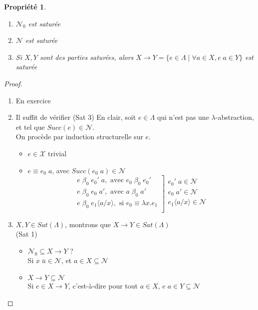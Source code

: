 \documentclass{article}
\newtheorem{prop}{Propriété}
\newcommand\subst[2]{\langle #1\big/#2\rangle}
\newcommand\lterm[2]{\lambda #1. #2}
\newcommand\tlambda[0]{$\lambda$}
\begin{document}
\begin{prop}
\begin{enumerate}[noitemsep,label=\roman*)]
\item $\mathcal{N}_0$ est saturée
\item $\mathcal{N}$ est saturée
\item Si $X, Y$ sont des parties saturées, alors $X \to Y = \{ e\in \Lambda \;|\; \forall a\in X, e\; a \in Y\}$ est saturée
\end{enumerate}
\end{prop}
\begin{proof}
\begin{enumerate}[noitemsep,label=\roman*)]
\item En exercice
\item Il suffit de vérifier (Sat 3)
En clair, soit $e\in \Lambda$ qui n'est pas une \tlambda-abstraction, et tel que $Succ(e)\in \mathcal{N}$.\\
On procède par induction structurelle sur $e$.
\begin{itemize}[label=*]
\item $e\in \mathcal{X}$ trivial
\item $e\equiv e_0\; a$, avec $Succ (e_0\; a)\in \mathcal{N}$
\[
\left.
\begin{array}{r}
e\;\beta_0\; e_0'\; a, \text{ avec } e_0\;\beta_0\; e_0'\\
e\;\beta_0\; e_0\; a', \text{ avec } a\;\beta_0\; a'\\
e\;\beta_0\; e_1\subst{a}{x}, \text{ si } e_0\equiv\lterm{x}{e_1}\\
\end{array}
\right]
\begin{array}{l}
e_0'\; a \in \mathcal{N}\\
e_0\; a'\in \mathcal{N}\\
e_1\subst{a}{x}\in \mathcal{N}\\
\end{array}
\]
\end{itemize}
\item $X,Y\in Sat(\Lambda)$, montrons que $X\to Y\in Sat(\Lambda)$\\
(Sat 1)
\begin{itemize}[label=*]
\item $\mathcal{N}_0\subseteq X \to Y$ ?\\
Si $x\;\bar{u}\in \mathcal{N}$, et $a\in X \subseteq \mathcal{N}$
\item $X\to Y\subseteq \mathcal{N}$\\
Si $e\in X\to Y$, c'est-à-dire pour tout $a\in X$, $e\; a \in Y \subseteq \mathcal{N}$
\end{itemize}
\smallskip



\end{enumerate}
\end{proof}
\end{document}
